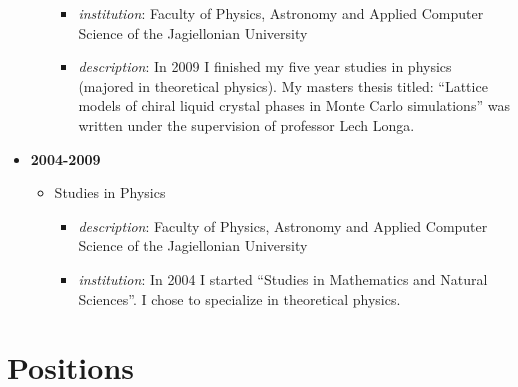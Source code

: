 \begin{itemize}
\begin{itemize}
    \begin{itemize}
    \tightlist
    \item
      \emph{institution}: Faculty of Physics, Astronomy and Applied
      Computer Science of the Jagiellonian University
    \item
      \emph{description}: In 2009 I finished my five year studies in
      physics (majored in theoretical physics). My masters thesis
      titled: ``Lattice models of chiral liquid crystal phases in Monte
      Carlo simulations'' was written under the supervision of professor
      Lech Longa.
    \end{itemize}
  \end{itemize}
\item
  \textbf{2004-2009}

  \begin{itemize}
  \tightlist
  \item
    Studies in Physics

    \begin{itemize}
    \tightlist
    \item
      \emph{description}: Faculty of Physics, Astronomy and Applied
      Computer Science of the Jagiellonian University
    \item
      \emph{institution}: In 2004 I started ``Studies in Mathematics and
      Natural Sciences''. I chose to specialize in theoretical physics.
    \end{itemize}
  \end{itemize}
\end{itemize}

\hypertarget{positions}{%
\section{Positions}\label{positions}}

